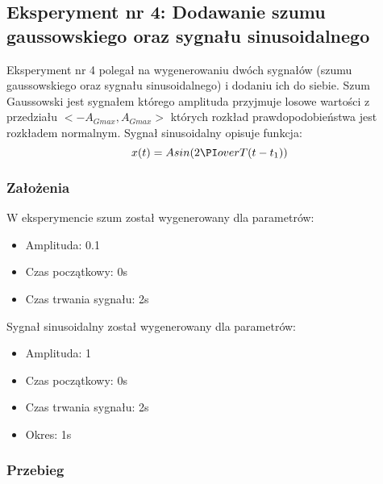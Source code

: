 \documentclass[12pt]{article}
\begin{document}

\newpage
\subsection{Eksperyment nr 4: Dodawanie szumu gaussowskiego oraz sygnału sinusoidalnego}

Eksperyment nr 4 polegał na wygenerowaniu dwóch sygnałów (szumu gaussowskiego oraz sygnału sinusoidalnego) i dodaniu ich do siebie. Szum Gaussowski jest sygnałem którego amplituda przyjmuje losowe wartości z przedziału $<-A_{Gmax},A_{Gmax}>$ których rozkład prawdopodobieństwa jest rozkładem normalnym. Sygnał sinusoidalny opisuje funkcja:
\begin{equation}
    x(t)=Asin({2\PI}over{T}(t-t_1))
\end{equation}
\subsubsection{Założenia}
W eksperymencie szum został wygenerowany dla parametrów:
\begin{itemize}
    \item Amplituda: 0.1
    \item Czas początkowy: 0s
    \item Czas trwania sygnału: 2s
\end{itemize}
Sygnał sinusoidalny został wygenerowany dla parametrów:
\begin{itemize}
    \item Amplituda: 1
    \item Czas początkowy: 0s
    \item Czas trwania sygnału: 2s
    \item Okres: 1s
\end{itemize}
\subsubsection{Przebieg}
\end{document}
